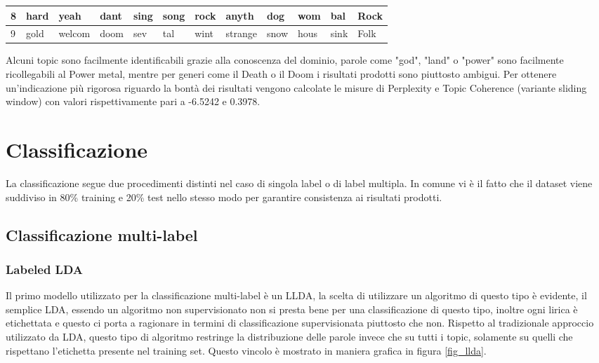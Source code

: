 \documentclass[technote]{IEEEtran}
\begin{document}
\begin{table}[H]
{\begin{tabular}{|l||llllllllll||l|}
8        & hard                  & yeah                  & dant                  & sing                  & song                  & rock                  & anyth                 & dog                   & wom                   & bal  & Rock            \\ \hline
9        & gold                  & welcom                & doom                  & sev                   & tal                   & wint                  & strange               & snow                  & hous                  & sink & Folk            \\ \hline
\end{tabular}
}
\label{t_topic_label}
\end{table}
Alcuni topic sono facilmente identificabili grazie alla conoscenza del dominio, parole come "god", "land" o "power" sono facilmente ricollegabili al Power metal, mentre per generi come il Death o il Doom i risultati prodotti sono piuttosto ambigui. Per ottenere un'indicazione più rigorosa riguardo la bontà dei risultati vengono calcolate le misure di Perplexity e Topic Coherence (variante sliding window) con valori rispettivamente pari a -6.5242 e 0.3978.
\section{Classificazione}
La classificazione segue due procedimenti distinti nel caso di singola label o di label multipla. In comune vi è il fatto che il dataset viene suddiviso in 80\% training e 20\% test nello stesso modo per garantire consistenza ai risultati prodotti.
\subsection{Classificazione multi-label}
\subsubsection{Labeled LDA}
Il primo modello utilizzato per la classificazione multi-label è un LLDA, la 
scelta di utilizzare un algoritmo di questo tipo è evidente, il semplice LDA, 
essendo un algoritmo non supervisionato non si presta bene per una 
classificazione di questo tipo, inoltre ogni lirica è etichettata e questo ci 
porta a ragionare in termini di classificazione supervisionata piuttosto che 
non. Rispetto al tradizionale approccio utilizzato da LDA, questo tipo di 
algoritmo restringe la distribuzione delle parole invece che su tutti i topic, 
solamente su quelli che rispettano l'etichetta presente nel training set. 
Questo vincolo è mostrato in maniera grafica in figura \ref{fig_llda}.
\end{document}

